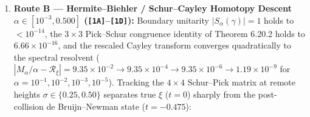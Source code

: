 \documentclass[
  11pt,
]{article}
\begin{document}
\begin{enumerate}
\def\labelenumi{\arabic{enumi}.}
\item
  \textbf{Route B --- Hermite--Biehler / Schur--Cayley Homotopy Descent
  \(\alpha \in [10^{-3}, 0.500]\)
  (\texttt{{[}1A{]}}--\texttt{{[}1D{]}}):} Boundary unitarity
  \(|S_\alpha(\gamma)| = 1\) holds to \(< 10^{-14}\), the \(3 \times 3\)
  Pick--Schur congruence identity of Theorem 6.20.2 holds to
  \(6.66 \times 10^{-16}\), and the rescaled Cayley transform converges
  quadratically to the spectral resolvent
  (\(|M_\alpha/\alpha - \mathcal{R}_\xi| = 9.35 \times 10^{-2} \to 9.35 \times 10^{-4} \to 9.35 \times 10^{-6} \to 1.19 \times 10^{-9}\)
  for \(\alpha = 10^{-1}, 10^{-2}, 10^{-3}, 10^{-5}\)). Tracking the
  \(4 \times 4\) Schur--Pick matrix at remote heights
  \(\sigma \in \{0.25, 0.50\}\) separates true \(\xi\) (\(t = 0\))
  sharply from the post-collision de Bruijn--Newman state
  (\(t = -0.475\)):


\end{enumerate}
\end{document}
